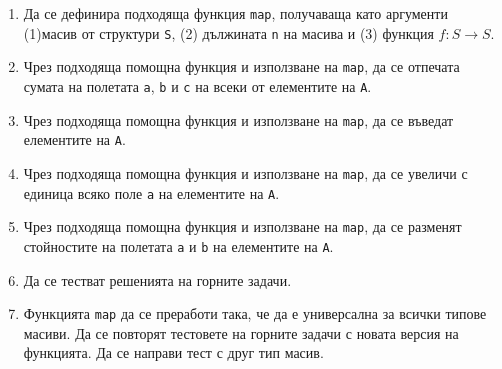 \documentclass[12pt,a4paper]{article}
\begin{document}
\begin{enumerate}
\begin{enumerate}
	\item Да се дефинира подходяща функция \texttt{map}, получаваща като аргументи (1)масив от структури \texttt{S}, (2) дължината \texttt{n} на масива и (3) функция $f:S \rightarrow S$. 
	\item Чрез подходяща помощна функция и използване на \texttt{map}, да се отпечата сумата на полетата \texttt{a}, \texttt{b} и \texttt{c} на всеки от елементите на \texttt{A}.
	\item Чрез подходяща помощна функция и използване на \texttt{map}, да се въведат елементите на \texttt{A}.
	\item Чрез подходяща помощна функция и използване на \texttt{map}, да се увеличи с единица всяко поле \texttt{a} на елементите на \texttt{A}.
	\item Чрез подходяща помощна функция и използване на \texttt{map}, да се разменят стойностите на полетата \texttt{a} и \texttt{b} на елементите на \texttt{A}.
	\item Да се тестват решенията на горните задачи.
	\item Функцията \texttt{map} да се преработи така, че да е универсална за всички типове масиви. Да се повторят тестовете на горните задачи с новата версия на функцията. Да се направи тест с друг тип масив.

	

\end{enumerate}

\end{enumerate}


	\vspace{20px}
\end{document}
